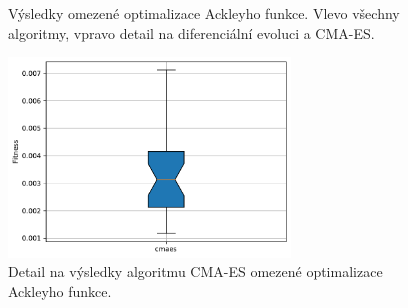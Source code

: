 \begin{figure}[H]
    \caption{Výsledky omezené optimalizace Ackleyho funkce. Vlevo všechny algoritmy, vpravo detail na diferenciální evoluci a CMA-ES.}
    \label{fg:bench:ackley:joined}
\end{figure}

\begin{figure}[H]
    \centering
	\includegraphics[width=75mm]{obrazky-figures/statistics/Benchmarks/Ackley/JOINED/cmaes_solutionsPlotsComparasion.pdf}
    \caption{Detail na výsledky algoritmu CMA-ES omezené optimalizace Ackleyho funkce.}
    \label{fg:bench:ackley:cmaes}
\end{figure}

